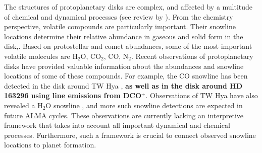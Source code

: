 \documentclass[apj]{emulateapj}
\newcommand{\emgr}[1]{\emph{ \color{gray} #1}}
\begin{document}
The structures of protoplanetary disks are complex, and affected by a multitude of chemical and dynamical processes (see review by \citealt{henning13}). From the chemistry perspective, volatile compounds are particularly important. Their snowline locations determine their relative abundance in gaseous and solid form in the disk,. Based on protostellar and comet abundances, some of the most important volatile molecules are H$_2$O, CO$_2$, CO, N$_2$. Recent observations of protoplanetary disks have provided valuable information about the abundances and snowline locations of some of these compounds. For example, the CO snowline has been detected in the disk around TW Hya \citep{qi13}, \textbf{as well as in the disk around HD 163296 \citep{mathews13} using line emissions from DCO$^+$}. Observations of TW Hya have also revealed a H$_2$O snowline \citep{zhang13}, and more such snowline detections are expected in future ALMA cycles. These observations are currently lacking an interpretive framework that takes into account all important dynamical and chemical processes. Furthermore, such a framework is crucial to connect observed snowline locations to planet formation.


\end{document}
